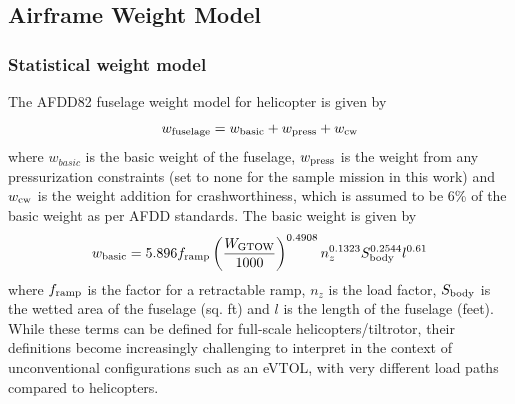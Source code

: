 \subsection{Airframe Weight Model}
\subsubsection{Statistical weight model}
The AFDD82 fuselage weight model for helicopter is given by
\begin{equation}
w_{\rm fuselage} = w_{\rm basic} + w_{\rm press} + w_{\rm cw}
\end{equation}
where $w_{basic}$ is the basic weight of the fuselage, $w_{\rm press}$ is the weight from any pressurization constraints (set to none for the sample mission in this work) and $w_{\rm cw}$ is the weight addition for crashworthiness, which is assumed to be 6\% of the basic weight as per AFDD standards. The basic weight is given by
\begin{equation}
\label{eqn:afdd82_fuselage}
w_{\rm basic} = 5.896 f_{\rm ramp} \left(\frac{W_{\rm GTOW}}{1000} \right) ^ {0.4908} n_z ^ {0.1323} S_{\rm body}^{0.2544} l^{0.61}
\end{equation}
where $f_{\rm ramp}$ is the factor for a retractable ramp, $n_z$ is the load factor, $S_{\rm body}$ is the wetted area of the fuselage (sq. ft) and $l$ is the length of the fuselage (feet). While these terms can be defined for full-scale helicopters/tiltrotor, their definitions become increasingly challenging to interpret in the context of unconventional configurations such as an eVTOL, with very different load paths compared to helicopters. %
